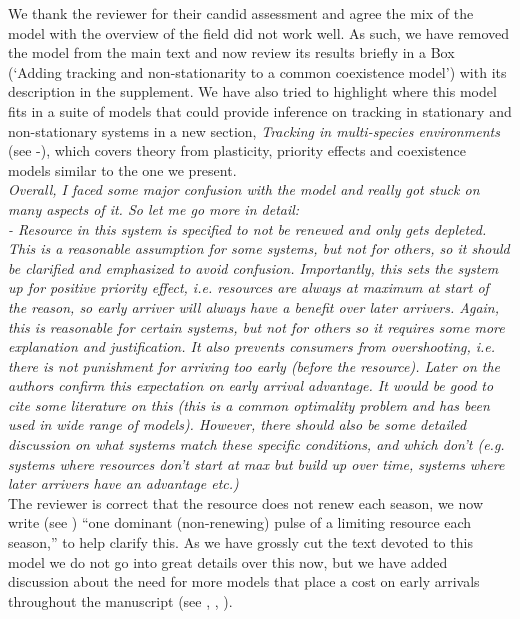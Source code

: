 \documentclass[11pt]{article}
\begin{document}
We thank the reviewer for their candid assessment and agree the mix of the model with the overview of the field did not work well. As such, we have removed the model from the main text and now review its results briefly in a Box (`Adding tracking and non-stationarity to a common coexistence model') with its description in the supplement. We have also tried to highlight where this model fits in a suite of models that could provide inference on tracking in stationary and non-stationary systems in a new section, \emph{Tracking in multi-species environments} (see -), which covers theory from plasticity, priority effects and coexistence models similar to the one we present.  \\


\emph{Overall, I faced some major confusion with the model and really got stuck on many aspects of
it. So let me go more in detail:\\
-       Resource in this system is specified to not be renewed and only gets depleted. This
is a reasonable assumption for some systems, but not for others, so it should be clarified
and emphasized to avoid confusion. Importantly, this sets the system up for positive priority
effect, i.e. resources are always at maximum at start of the reason, so early arriver will
always have a benefit over later arrivers. Again, this is reasonable for certain systems, but
not for others so it requires some more explanation and justification. It also prevents
consumers from overshooting, i.e. there is not punishment for arriving too early (before the
resource). Later on the authors confirm this expectation on early arrival advantage. It would
be good to cite some literature on this (this is a common optimality problem and has been
used in wide range of models). However, there should also be some detailed discussion on what
systems match these specific conditions, and which don't (e.g. systems where resources don't
start at max but build up over time, systems where later arrivers have an advantage etc.)}\\

The reviewer is correct that the resource does not renew each season, we now write (see ) ``one dominant (non-renewing) pulse of a limiting resource each season,'' to help clarify this.  As we have grossly cut the text devoted to this model we do not go into great details over this now, but we have added discussion about the need for more models that place a cost on early arrivals throughout the manuscript (see , , ). \\
\end{document}
